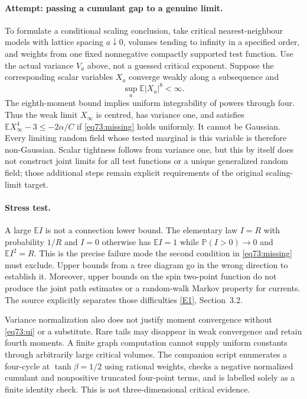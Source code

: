 \documentclass[11pt,a4paper]{article}
\numberwithin{equation}{section}
\newcommand{\eref}[2]{\hyperlink{extra:#1:#2}{[E#2]}}
\begin{document}
\paragraph{Attempt: passing a cumulant gap to a genuine limit.}
To formulate a conditional scaling conclusion, take critical nearest-neighbour
models with lattice spacing $a\downarrow0$, volumes tending to infinity
in a specified order, and weights from one fixed nonnegative compactly
supported test function. Use the actual variance $V_a$ above, not a guessed
critical exponent. Suppose the corresponding scalar variables $X_a$ converge
weakly along a subsequence and
\begin{equation}\label{eq73:ui}
 \sup_a\mathbb E|X_a|^8<\infty.
\end{equation}
The eighth-moment bound implies uniform integrability of powers through
four. Thus the weak limit $X_\infty$ is centred, has variance one, and
satisfies
$\mathbb E X_\infty^4-3\leq-2\alpha/C$ if
\eqref{eq73:missing} holds uniformly. It cannot be Gaussian.
Every limiting random field whose tested marginal is this variable is
therefore non-Gaussian. Scalar tightness follows from variance one, but
this by itself does not construct joint limits for all test functions or
a unique generalized random field; those additional steps remain explicit
requirements of the original scaling-limit target.

\paragraph{Stress test.}
A large $\mathbb E I$ is not a connection lower bound. The elementary law
$I=R$ with probability $1/R$ and $I=0$ otherwise has $\mathbb E I=1$
while $\mathbb P(I>0)\to0$ and $\mathbb E I^2=R$.
This is the precise failure mode the second condition in
\eqref{eq73:missing} must exclude. Upper bounds from a tree diagram go in
the wrong direction to establish it. Moreover, upper bounds on the
spin two-point function do not produce the joint path estimates or a
random-walk Markov property for currents. The source explicitly separates
those difficulties \eref{73}{1}, Section~3.2.

Variance normalization also does not justify moment convergence without
\eqref{eq73:ui} or a substitute. Rare tails may disappear in weak
convergence and retain fourth moments. A finite graph computation cannot
supply uniform constants through arbitrarily large critical volumes.
The companion script enumerates a four-cycle at $\tanh\beta=1/2$ using
rational weights, checks a negative normalized cumulant and nonpositive
truncated four-point terms, and is labelled solely as a finite identity
check. This is not three-dimensional critical evidence.
\end{document}
